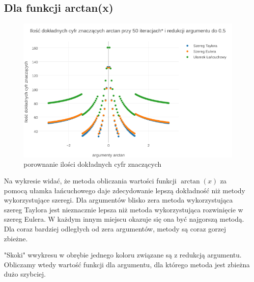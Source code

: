 \documentclass{article}
\begin{document}
\subsection{Dla funkcji arctan(x)}

	\begin{figure}[h]
		\includegraphics[width=1.1\textwidth,scale=1]{atan_znaczace.png}
		\caption{porownanie ilości dokładnych cyfr znaczących}
		\label{wskaźnik uwarunkowania}
	\end{figure}
\FloatBarrier
\noindent Na wykresie widać, że metoda obliczania wartości funkcji $\arctan(x)$ za pomocą ułamka łańcuchowego daje zdecydowanie lepszą dokładność niż metody wykorzystujące szeregi. Dla argumentów blisko zera metoda wykorzystująca szereg Taylora jest nieznacznie lepsza niż metoda wykorzystująca rozwinięcie w szereg Eulera. W każdym innym miejscu okazuje się ona być najgorszą metodą. Dla coraz bardziej odległych od zera argumentów, metody są coraz gorzej zbieżne.

\indent "Skoki" wwykresu w obrębie jednego koloru związane są z redukcją argumentu. Obliczamy wtedy wartość funkcji dla argumentu, dla którego metoda jest zbieżna dużo szybciej.

\pagebreak
\end{document}
